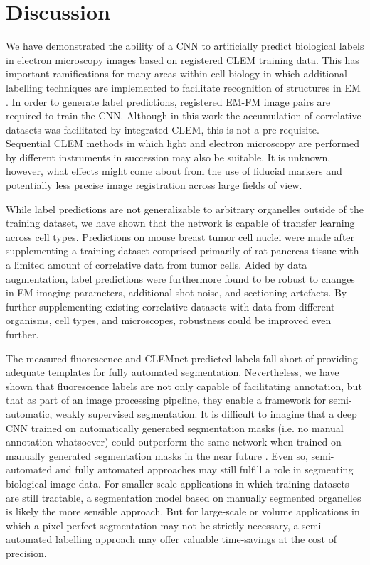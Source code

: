 \section{Discussion}
\label{sec:4.3_discussion}

We have demonstrated the ability of a CNN to artificially predict biological labels in electron microscopy images based on registered CLEM training data. This has important ramifications for many areas within cell biology in which additional labelling techniques are implemented to facilitate recognition of structures in EM \needref. In order to generate label predictions, registered EM-FM image pairs are required to train the CNN. Although in this work the accumulation of correlative datasets was facilitated by integrated CLEM, this is not a pre-requisite. Sequential CLEM methods in which light and electron microscopy are performed by different instruments in succession may also be suitable. It is unknown, however, what effects might come about from the use of fiducial markers and potentially less precise image registration across large fields of view. 

While label predictions are not generalizable to arbitrary organelles outside of the training dataset, we have shown that the network is capable of transfer learning across cell types. Predictions on mouse breast tumor cell nuclei were made after supplementing a training dataset comprised primarily of rat pancreas tissue with a limited amount of correlative data from tumor cells. Aided by data augmentation, label predictions were furthermore found to be robust to changes in EM imaging parameters, additional shot noise, and sectioning artefacts. By further supplementing existing correlative datasets with data from different organisms, cell types, and microscopes, robustness could be improved even further.

The measured fluorescence and CLEMnet predicted labels fall short of providing adequate templates for fully automated segmentation. Nevertheless, we have shown that fluorescence labels are not only capable of facilitating annotation, but that as part of an image processing pipeline, they enable a framework for semi-automatic, weakly supervised segmentation. It is difficult to imagine that a deep CNN trained on automatically generated segmentation masks (i.e. no manual annotation whatsoever) could outperform the same network when trained on manually generated segmentation masks in the near future \needref. Even so, semi-automated and fully automated approaches may still fulfill a role in segmenting biological image data. For smaller-scale applications in which training datasets are still tractable, a segmentation model based on manually segmented organelles is likely the more sensible approach. But for large-scale or volume applications in which a pixel-perfect segmentation may not be strictly necessary, a semi-automated labelling approach may offer valuable time-savings at the cost of precision.

